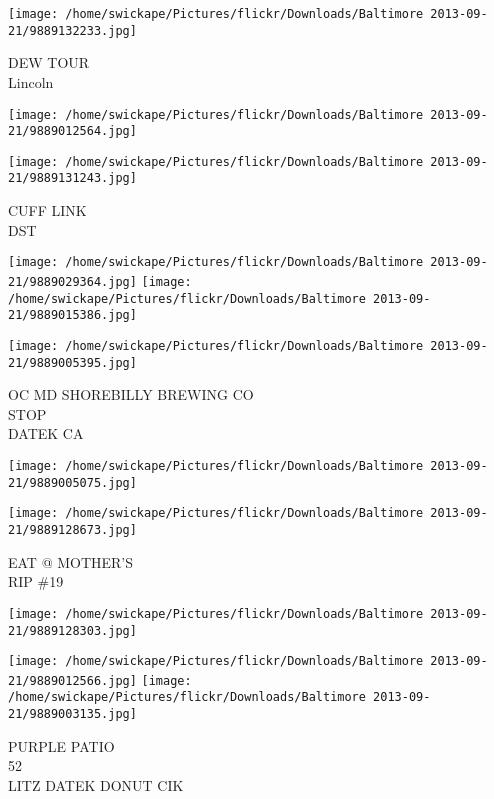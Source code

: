 \documentclass[10pt,letterpaper]{article}
\begin{document}
\vspace{0.25in}
\texttt{[image: /home/swickape/Pictures/flickr/Downloads/Baltimore 2013-09-21/9889132233.jpg]}

DEW TOUR\\
Lincoln\\
\pagebreak

\texttt{[image: /home/swickape/Pictures/flickr/Downloads/Baltimore 2013-09-21/9889012564.jpg]}

\vspace{0.25in}
\texttt{[image: /home/swickape/Pictures/flickr/Downloads/Baltimore 2013-09-21/9889131243.jpg]}

CUFF LINK\\
DST\\
\pagebreak

\texttt{[image: /home/swickape/Pictures/flickr/Downloads/Baltimore 2013-09-21/9889029364.jpg]}
\texttt{[image: /home/swickape/Pictures/flickr/Downloads/Baltimore 2013-09-21/9889015386.jpg]}

\vspace{0.25in}
\texttt{[image: /home/swickape/Pictures/flickr/Downloads/Baltimore 2013-09-21/9889005395.jpg]}

OC MD SHOREBILLY BREWING CO\\
STOP\\
DATEK CA\\
\pagebreak

\texttt{[image: /home/swickape/Pictures/flickr/Downloads/Baltimore 2013-09-21/9889005075.jpg]}

\vspace{0.25in}
\texttt{[image: /home/swickape/Pictures/flickr/Downloads/Baltimore 2013-09-21/9889128673.jpg]}

EAT @ MOTHER'S\\
RIP \#19\\
\pagebreak

\texttt{[image: /home/swickape/Pictures/flickr/Downloads/Baltimore 2013-09-21/9889128303.jpg]}

\vspace{0.25in}
\texttt{[image: /home/swickape/Pictures/flickr/Downloads/Baltimore 2013-09-21/9889012566.jpg]}
\texttt{[image: /home/swickape/Pictures/flickr/Downloads/Baltimore 2013-09-21/9889003135.jpg]}

PURPLE PATIO\\
52\\
LITZ DATEK DONUT CIK\\
\pagebreak
\end{document}
